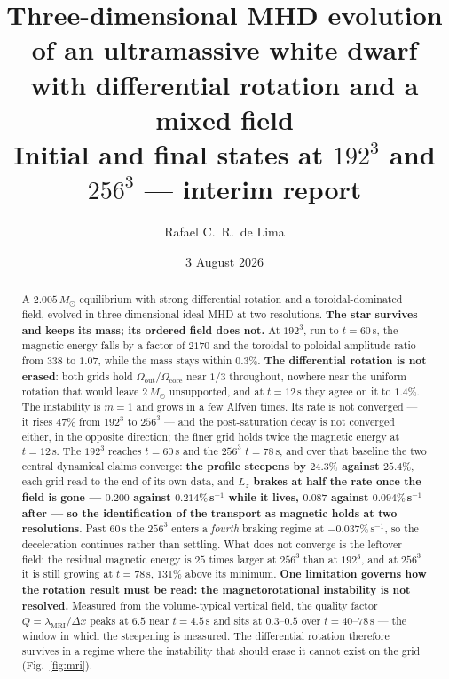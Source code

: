 \documentclass[11pt,a4paper]{article}
\title{\textbf{Three-dimensional MHD evolution of an ultramassive white dwarf\\
with differential rotation and a mixed field}\\[0.3em]
\large Initial and final states at $192^3$ and $256^3$ --- interim report}
\author{Rafael C.\ R.\ de Lima}
\date{3 August 2026}
\newcommand{\Msun}{M_\odot}
\begin{document}
\maketitle

\begin{abstract}
\noindent
A $2.005\,\Msun$ equilibrium with strong differential rotation and a
toroidal-dominated field, evolved in three-dimensional ideal MHD at two
resolutions. \textbf{The star survives and keeps its mass; its ordered field
does not.} At $192^3$, run to $t = 60$\,s, the magnetic energy falls by a
factor of $2170$ and the toroidal-to-poloidal amplitude ratio from $338$ to
$1.07$, while the mass stays within $0.3\%$. \textbf{The differential rotation
is not erased}: both grids hold
$\Omega_{\mathrm{out}}/\Omega_{\mathrm{core}}$ near $1/3$ throughout, nowhere
near the uniform rotation that would leave $2\,\Msun$ unsupported, and at
$t = 12$\,s they agree on it to $1.4\%$. The instability is $m=1$ and grows in
a few Alfv\'en times. Its rate is not converged --- it rises $47\%$ from
$192^3$ to $256^3$ --- and the post-saturation decay is not converged either,
in the opposite direction; the finer grid holds twice the magnetic energy at
$t = 12$\,s. The $192^3$ reaches $t = 60$\,s and the $256^3$
$t = 78$\,s, and over that baseline the two central dynamical claims converge:
\textbf{the profile steepens by $24.3\%$ against $25.4\%$}, each grid read to
the end of its own data, and \textbf{$L_z$ brakes at half the rate once the
field is gone --- $0.200$ against $0.214\%$\,s$^{-1}$ while it lives, $0.087$
against $0.094\%$\,s$^{-1}$ after --- so the identification of the transport as
magnetic holds at two resolutions}. Past $60$\,s the $256^3$ enters a
\emph{fourth} braking regime at $-0.037\%$\,s$^{-1}$, so the deceleration
continues rather than settling. What does not converge is the leftover field:
the residual magnetic energy is $25$ times larger at $256^3$ than at $192^3$,
and at $256^3$ it is still growing at $t = 78$\,s, $131\%$ above its minimum.
\textbf{One limitation governs how the rotation result must be read: the
magnetorotational instability is not resolved.} Measured from the
volume-typical vertical field, the quality factor $Q = \lambda_{\mathrm{MRI}}/
\Delta x$ peaks at $6.5$ near $t = 4.5$\,s and sits at $0.3$--$0.5$ over
$t = 40$--$78$\,s --- the window in which the steepening is measured. The
differential rotation therefore survives in a regime where the instability
that should erase it cannot exist on the grid (Fig.~\ref{fig:mri}).
\end{abstract}
\end{document}
